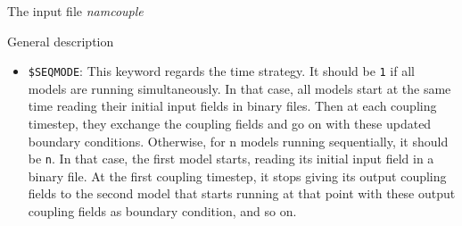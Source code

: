 \begin{subsection}{The input file {\it namcouple}}
\begin{subsubsection}{General description}
\begin{itemize}

\item {\tt \$SEQMODE}: This keyword regards the time strategy. It should be
{\tt 1} if all models are running simultaneously. In that case, all
models start at the same time reading their initial input fields
in binary files. Then at each coupling timestep, they exchange the
coupling fields and go on with these updated boundary conditions. 
Otherwise, for n models running sequentially, it should be {\tt n}. In
that case, the first model starts, reading its initial input field
in a binary file. At the first coupling timestep, it stops giving its
output coupling fields to the second model that starts running at that
point with these output coupling fields as boundary condition, and so
on.
 

\end{itemize}
\end{subsubsection}
\end{subsection}

